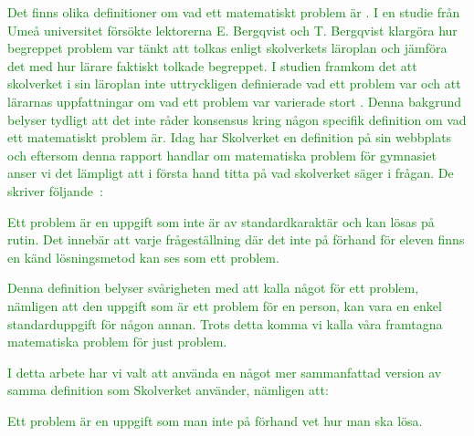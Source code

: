 
\textcolor{green}{Det finns olika definitioner om vad ett matematiskt problem är \cite{olikaDefinitioner}. I en studie från Umeå universitet försökte lektorerna E. Bergqvist och T. Bergqvist klargöra hur begreppet problem var tänkt att tolkas enligt skolverkets läroplan och jämföra det med hur lärare faktiskt tolkade begreppet. I studien framkom det att skolverket i sin läroplan inte uttryckligen definierade vad ett problem var och att lärarnas uppfattningar om vad ett problem var varierade stort \cite{problemVarierandeDef}. Denna bakgrund belyser tydligt att det inte råder konsensus kring någon specifik definition om vad ett matematiskt problem är. Idag har Skolverket en definition på sin webbplats och eftersom denna rapport handlar om matematiska problem för gymnasiet anser vi det lämpligt att i första hand titta på vad skolverket säger i frågan. De skriver följande~\cite{ProblemDef}:}

\begin{displayquote}
\textcolor{green}{Ett problem är en uppgift som inte är av standardkaraktär och kan lösas på rutin. Det innebär att varje frågeställning där det inte på förhand för eleven finns en känd lösningsmetod kan ses som ett problem.}
\end{displayquote}

\noindent\textcolor{green}{Denna definition belyser svårigheten med att kalla något för ett problem, nämligen att den uppgift som är ett problem för en person, kan vara en enkel standarduppgift för någon annan. Trots detta komma vi kalla våra framtagna matematiska problem för just problem.} 

\textcolor{green}{I detta arbete har vi valt att använda en något mer sammanfattad version av samma definition som Skolverket använder, nämligen att:}

\begin{displayquote}
\textcolor{green}{Ett problem är en uppgift som man inte på förhand vet hur man ska lösa.}
\end{displayquote}

\noindent %

